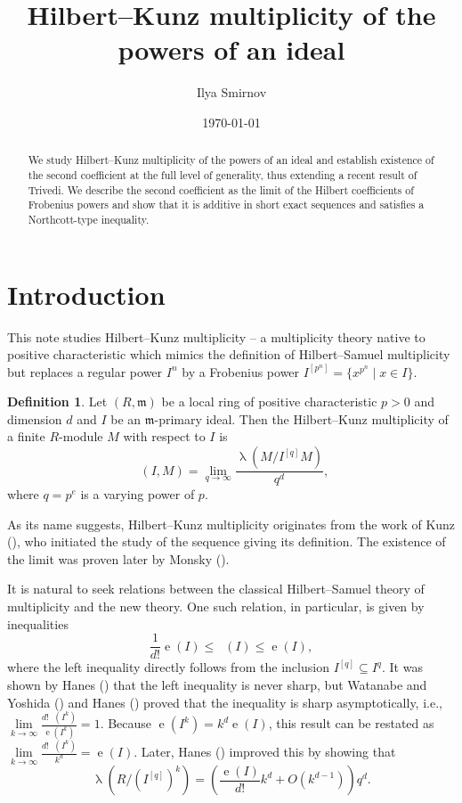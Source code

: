 \documentclass[12pt]{amsart}
\newcommand{\length}{\operatorname{\lambda}}
\newcommand{\mf}[1]{\mathfrak #1}
\DeclareMathOperator{\eh}{e}
\DeclareMathOperator{\ehk}{e_{HK}}
\renewcommand{\frq}[1]{{#1}^{[q]}}
\theoremstyle{definition}
\newtheorem{definition}[theorem]{Definition}
\theoremstyle{remark}
\numberwithin{theorem}{section}
\numberwithin{equation}{section}
\begin{document}
\title[Hilbert--Kunz multiplicity of the powers of an ideal]
{Hilbert--Kunz multiplicity of the powers of an ideal}

\author{Ilya Smirnov}
\address{Department of Mathematics, Stockholm University, S-10691, Stockholm, Sweden}


\date{\today}

\begin{abstract}
We study Hilbert--Kunz multiplicity of the powers of an ideal and establish existence of the second coefficient at
the full level of generality, thus extending a recent result of Trivedi.
We describe the second coefficient as the limit of the Hilbert coefficients of Frobenius powers 
and show that it is additive in short exact sequences and satisfies a Northcott-type inequality. 

\end{abstract}

\maketitle

\section{Introduction}

This note studies Hilbert--Kunz multiplicity -- a multiplicity theory native to positive characteristic which
mimics the definition of Hilbert--Samuel multiplicity but replaces a regular power $I^n$ by 
a Frobenius power $I^{[p^n]} = \{x^{p^n} \mid x \in I\}$.
\begin{definition}
Let $(R, \mf m)$ be a local ring of positive characteristic $p > 0$ and dimension $d$ 
and $I$ be an $\mf m$-primary ideal.
Then the Hilbert--Kunz multiplicity of a finite $R$-module $M$ with respect to $I$ is 
\[
\ehk(I, M) = \lim_{q \to \infty} \frac{\length (M/\frq{I}M)}{q^{d}},
\]
where $q = p^e$ is a varying power of $p$.
\end{definition}
As its name suggests, Hilbert--Kunz multiplicity originates from the work of Kunz (\cite{Kunz1, Kunz2}),
who initiated the study of the sequence giving its definition. The existence of the limit was proven
later by Monsky (\cite{Monsky}). 

It is natural to seek relations between the classical Hilbert--Samuel theory of multiplicity and the new theory. 
One such relation, in particular, is given by inequalities 
\[
\frac 1{d!} \eh(I) \leq \ehk (I) \leq \eh(I),
\]
where the left inequality directly follows from the inclusion $\frq{I} \subseteq I^q$. 
It was shown by Hanes (\cite{Hanes2}) that the left inequality is never sharp, 
but Watanabe and Yoshida (\cite[Theorem~1.1]{WatanabeYoshidaTwo}) and Hanes (\cite[Corollary~II.7]{Hanes})
proved that the inequality is sharp asymptotically, i.e., 
$\lim\limits_{k \to \infty} \frac{d!\ehk (I^k)}{\eh(I^k)} = 1$.
Because $\eh(I^k) = k^d \eh(I)$, this result can be restated as 
$\lim\limits_{k \to \infty} \frac{d!\ehk(I^k)}{k^d} = \eh(I)$.
 Later, Hanes (\cite[Theorem~3.2]{Hanes2}) improved this  by showing that
\[
\length (R/(\frq{I})^k) = \left( \frac{\eh(I)}{d!}k^d + O(k^{d-1})\right) q^d.
\]
\end{document}
